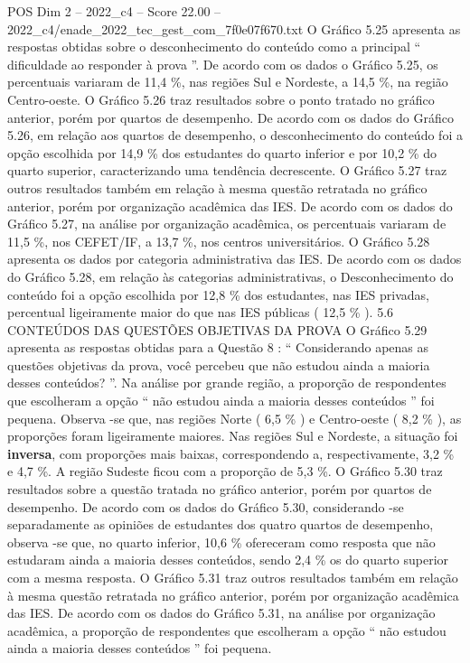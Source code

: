 \begin{textsample}{POS Dim 2 – 2022\_c4 – Score 22.00 – 2022\_c4/enade\_2022\_tec\_gest\_com\_7f0e07f670.txt}
O Gráfico 5.25 apresenta as respostas obtidas sobre o desconhecimento do conteúdo como a principal “ dificuldade ao responder à prova ”.
De acordo com os dados o Gráfico 5.25, os percentuais variaram de 11,4 \%, nas regiões Sul e Nordeste, a 14,5 \%, na região Centro-oeste.
O Gráfico 5.26 traz resultados sobre o ponto tratado no gráfico anterior, porém por quartos de desempenho.
De acordo com os dados do Gráfico 5.26, em relação aos quartos de desempenho, o desconhecimento do conteúdo foi a opção escolhida por 14,9 \% dos estudantes do quarto inferior e por 10,2 \% do quarto superior, caracterizando uma tendência decrescente.
O Gráfico 5.27 traz outros resultados também em relação à mesma questão retratada no gráfico anterior, porém por organização acadêmica das IES.
De acordo com os dados do Gráfico 5.27, na análise por organização acadêmica, os percentuais variaram de 11,5 \%, nos CEFET/IF, a 13,7 \%, nos centros universitários.
O Gráfico 5.28 apresenta os dados por categoria administrativa das IES.
De acordo com os dados do Gráfico 5.28, em relação às categorias administrativas, o Desconhecimento do conteúdo foi a opção escolhida por 12,8 \% dos estudantes, nas IES privadas, percentual ligeiramente maior do que nas IES públicas ( 12,5 \% ). 5.6 CONTEÚDOS DAS QUESTÕES OBJETIVAS DA PROVA O Gráfico 5.29 apresenta as respostas obtidas para a Questão 8 : “ Considerando apenas as questões objetivas da prova, você percebeu que não estudou ainda a maioria desses conteúdos? ”.
Na análise por grande região, a proporção de respondentes que escolheram a opção “ não estudou ainda a maioria desses conteúdos ” foi pequena.
Observa -se que, nas regiões Norte ( 6,5 \% ) e Centro-oeste ( 8,2 \% ), as proporções foram ligeiramente maiores.
Nas regiões Sul e Nordeste, a situação foi \textbf{inversa}, com proporções mais baixas, correspondendo a, respectivamente, 3,2 \% e 4,7 \%.
A região Sudeste ficou com a proporção de 5,3 \%.
O Gráfico 5.30 traz resultados sobre a questão tratada no gráfico anterior, porém por quartos de desempenho.
De acordo com os dados do Gráfico 5.30, considerando -se separadamente as opiniões de estudantes dos quatro quartos de desempenho, observa -se que, no quarto inferior, 10,6 \% ofereceram como resposta que não estudaram ainda a maioria desses conteúdos, sendo 2,4 \% os do quarto superior com a mesma resposta.
O Gráfico 5.31 traz outros resultados também em relação à mesma questão retratada no gráfico anterior, porém por organização acadêmica das IES.
De acordo com os dados do Gráfico 5.31, na análise por organização acadêmica, a proporção de respondentes que escolheram a opção “ não estudou ainda a maioria desses conteúdos ” foi pequena.

\end{textsample}
